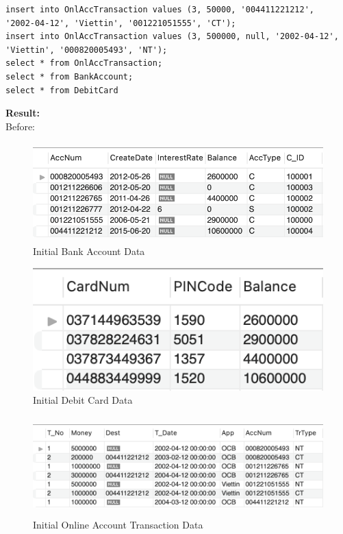 \documentclass[12pt,a4paper]{article}
\begin{document}
\begin{verbatim}
insert into OnlAccTransaction values (3, 50000, '004411221212',
'2002-04-12', 'Viettin', '001221051555', 'CT');
insert into OnlAccTransaction values (3, 500000, null, '2002-04-12',
'Viettin', '000820005493', 'NT');
select * from OnlAccTransaction;
select * from BankAccount;
select * from DebitCard
\end{verbatim}

\textbf{Result:}\\
Before:
\begin{figure}[H]
    \centering
    \includegraphics[width=5.5in,height=1.5in]{Picture/BankAccountData.png}
    \caption{Initial Bank Account Data}
\end{figure}

\begin{figure}[H]
    \centering
    \includegraphics[]{Picture/DebitCardData.png}
    \caption{Initial Debit Card Data}
\end{figure}

\begin{figure}[H]
    \centering
    \includegraphics[width=5.5in,height=1.5in]{Picture/OnlAccTransactionData.png}
    \caption{Initial Online Account Transaction Data}
\end{figure}
\end{document}
